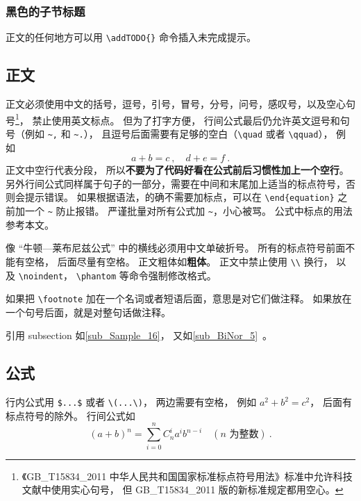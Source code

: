 \subsubsection{黑色的子节标题}
正文的任何地方可以用 \verb|\addTODO{}| 命令插入未完成提示。

\subsection{正文}\label{sub_Sample_16}
正文必须使用中文的括号，逗号，引号，冒号，分号，问号，感叹号，以及空心句号\footnote{《GB\_T15834\_2011 中华人民共和国国家标准标点符号用法》标准中允许科技文献中使用实心句号， 但 GB\_T15834\_2011 版的新标准规定都用空心。}， 禁止使用英文标点。 但为了打字方便， 行间公式最后仍允许英文逗号和句号（例如 \verb|~,| 和 \verb|~.|）， 且逗号后面需要有足够的空白（\verb|\quad| 或者 \verb|\qquad|）， 例如
\begin{equation}\label{eq_Sample_2}
a + b = c~, \quad d + e = f~.
\end{equation}
正文中空行代表分段， 所以\textbf{不要为了代码好看在公式前后习惯性加上一个空行}。 另外行间公式同样属于句子的一部分，需要在中间和末尾加上适当的标点符号，否则会提示错误。 如果根据语法，的确不需要加标点，可以在 \verb|\end{equation}| 之前加一个 \verb|~| 防止报错。 严谨批量对所有公式加 \verb|~|，小心被骂。 公式中标点的用法参考本文。

像 “牛顿—莱布尼兹公式” 中的横线必须用中文单破折号。 所有的标点符号前面不能有空格， 后面尽量有空格。 正文粗体如\textbf{粗体}。 正文中禁止使用 \verb|\\| 换行， 以及 \verb|\noindent|， \verb|\phantom| 等命令强制修改格式。

如果把 \verb|\footnote| 加在一个名词或者短语后面，意思是对它们做注释。 如果放在一个句号后面，就是对整句话做注释。

引用 subsection 如\autoref{sub_Sample_16}， 又如\autoref{sub_BiNor_5}~。

\subsection{公式}
行内公式用 \verb|$...$| 或者 \verb|\(...\)|， 两边需要有空格， 例如 $a^2+b^2=c^2$， 后面有标点符号的除外。 行间公式如
\begin{equation}\label{eq_Sample_1}
(a+b)^n = \sum_{i=0}^n C_n^i a^i b^{n-i} \quad (\text{$n$ 为整数})~.
\end{equation}


